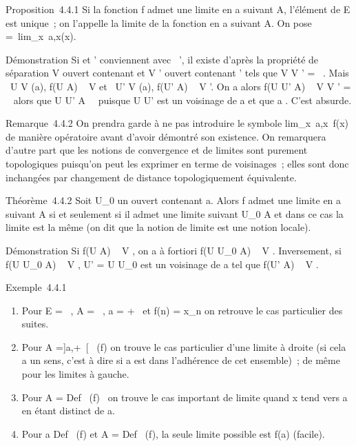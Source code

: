 \documentclass[]{article}
\begin{document}
Proposition~4.4.1 Si la fonction f admet une limite en a suivant A,
l'élément \ell de E est unique~; on l'appelle la limite de la fonction en a
suivant A. On pose \ell =\
lim\_x\rightarrow~a,x\inAf(x).

Démonstration Si \ell et \ell' conviennent avec \ell\neq~\ell', il existe d'après la
propriété de séparation V ouvert contenant \ell et V ' ouvert contenant \ell'
tels que V \bigcap V ' = \varnothing~. Mais \exists~U \in V (a), f(U \bigcap
A) \subset~ V et \exists~U' \in V (a), f(U' \bigcap A) \subset~ V '. On a
alors f(U \bigcap U' \bigcap A) \subset~ V \bigcap V ' = \varnothing~ alors que U \bigcap U' \bigcap
A\neq~\varnothing~ puisque U \bigcap U' est un voisinage de a et
que a \in\overlineA. C'est absurde.

Remarque~4.4.2 On prendra garde à ne pas introduire le symbole
lim\_x\rightarrow~a,x\inA~f(x) de manière opératoire
avant d'avoir démontré son existence. On remarquera d'autre part que les
notions de convergence et de limites sont purement topologiques
puisqu'on peut les exprimer en terme de voisinages~; elles sont donc
inchangées par changement de distance topologiquement équivalente.

Théorème~4.4.2 Soit U\_0 un ouvert contenant a. Alors f admet
une limite en a suivant A si et seulement si il admet une limite suivant
U\_0 \bigcap A et dans ce cas la limite est la même (on dit que la
notion de limite est une notion locale).

Démonstration Si f(U \bigcap A) \subset~ V , on a à fortiori f(U \bigcap U\_0 \bigcap A)
\subset~ V . Inversement, si f(U \bigcap U\_0 \bigcap A) \subset~ V , U' = U \bigcap
U\_0 est un voisinage de a tel que f(U' \bigcap A) \subset~ V .

Exemple~4.4.1

\begin{enumerate}
\itemsep1pt\parskip0pt
\item
  Pour E = \overline{}~, A = ~, a = +\infty~ et f(n) =
  x\_n on retrouve le cas particulier des suites.
\item
  Pour A ={]}a,+\infty~{[}\bigcapDef~ (f) on trouve le cas
  particulier d'une limite à droite (si cela a un sens, c'est à dire si
  a est dans l'adhérence de cet ensemble)~; de même pour les limites à
  gauche.
\item
  Pour A = Def~ (f)
  \diagdown\a\ on trouve le cas important de
  limite quand x tend vers a en étant distinct de a.
\item
  Pour a \in Def~ (f) et A
  = Def~ (f), la seule limite possible est f(a)
  (facile).
\end{enumerate}
\end{document}
